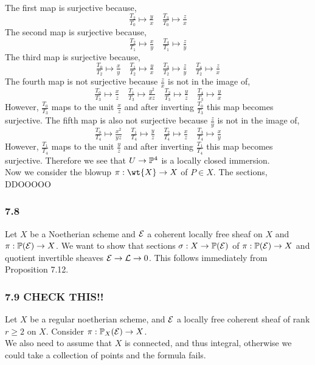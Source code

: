 \documentclass[12pt]{article}
\begin{document}
\begin{enumerate}
\begin{align*}
\end{align*}
The first map is surjective because,
\[ \tfrac{T_2}{T_0} \mapsto \tfrac{y}{x} \quad \tfrac{T_3}{T_0} \mapsto \tfrac{z}{x} \]
The second map is surjective because,
\[ \tfrac{T_2}{T_1} \mapsto \tfrac{x}{y} \quad \tfrac{T_4}{T_1} \mapsto \tfrac{z}{y} \]
The third map is surjective because,
\[ \tfrac{T_0}{T_2} \mapsto \tfrac{x}{y} \quad \tfrac{T_1}{T_2} \mapsto \tfrac{y}{x} \quad \tfrac{T_3}{T_2} \mapsto \tfrac{z}{y} \quad \tfrac{T_4}{T_2} \mapsto \tfrac{z}{x} \]
The fourth map is not surjective because $\frac{z}{x}$ is not in the image of,
\[ \tfrac{T_0}{T_3} \mapsto \tfrac{x}{z} \quad \tfrac{T_1}{T_3} \mapsto \tfrac{y^2}{xz} \quad \tfrac{T_2}{T_3} \mapsto \tfrac{y}{z} \quad \tfrac{T_4}{T_3} \mapsto \tfrac{y}{x} \]
However, $\tfrac{T_0}{T_3}$ maps to the unit $\frac{x}{z}$ and after inverting $\tfrac{T_0}{T_3}$ this map becomes surjective. 
The fifth map is also not surjective because $\frac{z}{y}$ is not in the image of,
\[ \tfrac{T_0}{T_4} \mapsto \tfrac{x^2}{yz} \quad \tfrac{T_1}{T_4} \mapsto \tfrac{y}{z} \quad \tfrac{T_2}{T_4} \mapsto \tfrac{x}{z} \quad \tfrac{T_3}{T_4} \mapsto \tfrac{x}{y} \]
However, $\tfrac{T_1}{T_4}$ maps to the unit $\frac{y}{z}$ and after inverting $\tfrac{T_1}{T_4}$ this map becomes surjective. Therefore we see that $U \to \P^4$ is a locally closed immersion.
\bigskip\\
Now we consider the blowup $\pi : \wt{X} \to X$ of $P \in X$. The sections, DDOOOOO
\end{enumerate}

\subsubsection{7.8}

Let $X$ be a Noetherian scheme and $\E$ a coherent locally free sheaf on $X$ and $\pi : \P(\E) \to X$. We want to show that sections $\sigma : X \to \P(\E)$ of $\pi : \P(\E) \to X$ and quotient invertible sheaves $\E \to \L \to 0$. This follows immediately from Proposition 7.12.

\subsubsection{7.9 CHECK THIS!!}

Let $X$ be a regular noetherian scheme, and $\E$ a locally free coherent sheaf of rank $r \ge 2$ on $X$. Consider $\pi : \P_X(\E) \to X$.
\bigskip\\
We also need to assume that $X$ is connected, and thus integral, otherwise we could take a collection of points and the formula fails. 
\end{document}
